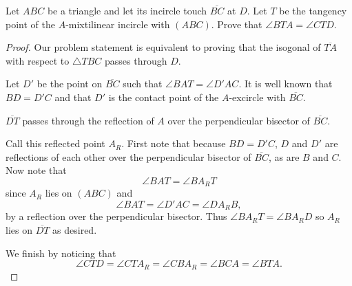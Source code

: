 \documentclass[letterpaper,oneside]{scrartcl}
\providecommand{\ol}{\overline}
\begin{document}
\begin{problem*}
  [4.49]
  Let $ABC$ be a triangle and let its incircle touch $\overline{BC}$ at $D$. Let $T$ be the tangency point of the $A$-mixtilinear incircle with $(ABC)$. Prove that $ \angle BTA = \angle CTD $.
\end{problem*}
\begin{proof}
  Our problem statement is equivalent to proving that the isogonal of \(\ol{TA}\) with respect to \(\triangle TBC\) passes through \(D\).

  Let \(D'\) be the point on \(\ol{BC}\) such that \(\angle BAT = \angle D'AC\). It is well known that \(BD=D'C\) and that \(D'\) is the contact point of the \(A\)-excircle with \(\ol{BC}\). 

  \begin{claim*}
    \(\ol{DT}\) passes through the reflection of \(A\) over the perpendicular bisector of \(\ol{BC}\).
  \end{claim*}
  \begin{subproof}
    Call this reflected point \(A_R\). First note that because \(BD = D'C\), \(D\) and \(D'\) are reflections of each other over the perpendicular bisector of \(\ol{BC}\), as are \(B\) and \(C\). Now note that
    \[\angle BAT = \angle BA_RT\]
    since \(A_R\) lies on \((ABC)\) and
    \[\angle BAT = \angle D'AC = \angle DA_RB,\]
    by a reflection over the perpendicular bisector. Thus \(\angle BA_RT = \angle BA_RD\) so \(A_R\) lies on \(\ol{DT}\) as desired.
  \end{subproof}
  We finish by noticing that 
  \[\angle CTD = \angle CTA_R = \angle CBA_R = \angle BCA = \angle BTA.\]
\end{proof}
\end{document}
